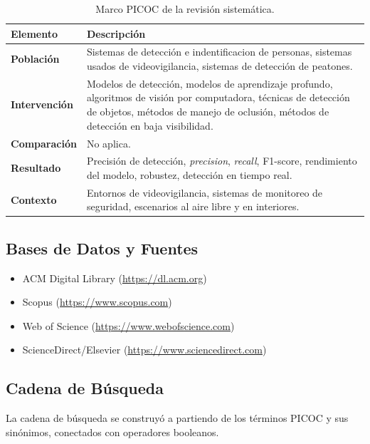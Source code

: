 \documentclass[12pt, a4paper]{article}
\begin{document}
\begin{table}[H]
\centering
\caption{Marco PICOC de la revisi\'{o}n sistem\'{a}tica.}
\label{tab:picoc}
\begin{tabularx}{\linewidth}{>{\bfseries}lX}
\toprule
Elemento & Descripci\'{o}n \\
\midrule
Poblaci\'{o}n    & Sistemas de detecci\'{o}n e indentificacion de personas, sistemas usados de
                   videovigilancia, sistemas de detecci\'{o}n de peatones. \\
Intervenci\'{o}n & Modelos de detecci\'{o}n, modelos de aprendizaje
                   profundo, algoritmos de visi\'{o}n por computadora,
                   t\'{e}cnicas de detecci\'{o}n de objetos, m\'{e}todos
                   de manejo de oclusi\'{o}n, m\'{e}todos de
                   detecci\'{o}n en baja visibilidad. \\
Comparaci\'{o}n  & No aplica. \\
Resultado        & Precisi\'{o}n de detecci\'{o}n, \textit{precision},
                   \textit{recall}, F1-score, rendimiento del modelo,
                   robustez, detecci\'{o}n en tiempo real. \\
Contexto         & Entornos de videovigilancia, sistemas de monitoreo
                   de seguridad, escenarios al aire libre y en interiores. \\
\bottomrule
\end{tabularx}
\end{table}

\subsection{Bases de Datos y Fuentes}

\begin{itemize}
  \item ACM Digital Library (\url{https://dl.acm.org})
  \item Scopus (\url{https://www.scopus.com})
  \item Web of Science (\url{https://www.webofscience.com})
  \item ScienceDirect/Elsevier (\url{https://www.sciencedirect.com})
\end{itemize}

\subsection{Cadena de B\'{u}squeda}

La cadena de b\'{u}squeda se construy\'{o} a partiendo de los
t\'{e}rminos PICOC y sus sin\'{o}nimos, conectados con operadores
booleanos.
\end{document}
